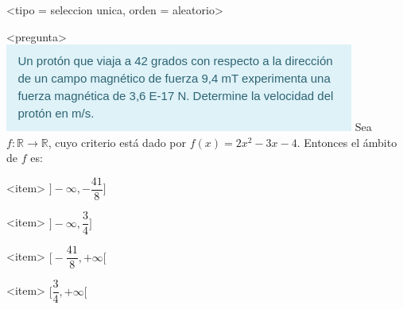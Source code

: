 <tipo = seleccion unica, orden = aleatorio>

<pregunta>
\includegraphics{preg1.png}
Sea $f:\mathbb R \to \mathbb R$, cuyo criterio est\'a dado por $f(x) = 2x^2 -3x -4$. Entonces el \'ambito de $f$ es:


<item>
$\bigg]{-}\infty, -\dfrac{41}{8}\bigg]$

<item>
$\bigg]{-}\infty, \dfrac{3}{4}\bigg]$

<item>
$\bigg[-\dfrac{41}{8}, +\infty\bigg[$

<item>
$\bigg[\dfrac{3}{4}, +\infty\bigg[$



